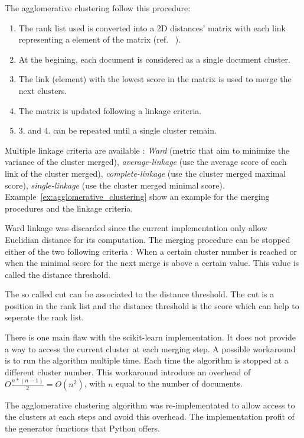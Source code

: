 The agglomerative clustering follow this procedure:
\begin{enumerate}
  \item The rank list used is converted into a 2D distances' matrix with each link representing a element of the matrix (ref. ~\label{sec:distances_matrix}).
  \item At the begining, each document is considered as a single document cluster.
  \item The link (element) with the lowest score in the matrix is used to merge the next clusters.
  \item The matrix is updated following a linkage criteria.
  \item 3. and 4. can be repeated until a single cluster remain.
\end{enumerate}

Multiple linkage criteria are available : \textit{Ward} (metric that aim to minimize the variance of the cluster merged), \textit{average-linkage} (use the average score of each link of the cluster merged), \textit{complete-linkage} (use the cluster merged maximal score), \textit{single-linkage} (use the cluster merged minimal score).
Example~\ref{ex:agglomerative_clustering} show an example for the merging procedures and the linkage criteria.

Ward linkage was discarded since the current implementation only allow Euclidian distance for its computation.
The merging procedure can be stopped either of the two following criteria : When a certain cluster number is reached or when the minimal score for the next merge is above a certain value.
This value is called the distance threshold.

The so called cut can be associated to the distance threshold.
The cut is a position in the rank list and the distance threshold is the score which can help to seperate the rank list.

There is one main flaw with the scikit-learn implementation.
It does not provide a way to access the current cluster at each merging step.
A possible workaround is to run the algorithm multiple time.
Each time the algorithm is stopped at a different cluster number.
This workaround introduce an overhead of $O\frac{n * (n - 1)}{2} = O(n^2)$, with $n$ equal to the number of documents.

The agglomerative clustering algorithm was re-implementated to allow access to the clusters at each steps and avoid this overhead.
The implementation profit of the generator functions that Python offers.

